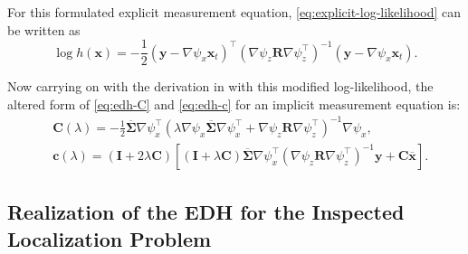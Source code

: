 For this formulated explicit measurement equation, \eqref{eq:explicit-log-likelihood} can be written as
\begin{equation}
  \log h(\mathbf{x}) =-\frac{1}{2}(\mathbf{y}-\nabla \psi_x \mathbf{x}_t)^{\top} (\nabla \psi_z\mathbf{R}\nabla \psi_z^{\top})^{-1}(\mathbf{y}-\nabla \psi_x \mathbf{x}_t).
\end{equation}

Now carrying on with the derivation in \cite{Khan2018} with this modified log-likelihood,
the altered form of \eqref{eq:edh-C} and \eqref{eq:edh-c} for an implicit measurement
equation is:
\begin{align}
   & \mathbf{C}(\lambda) = -\frac{1}{2}\mathbf{\mathbf{\overline\Sigma}}\nabla \psi_x^\top\left(\lambda \nabla \psi_x\mathbf{\overline\Sigma}\nabla \psi_x^\top + \nabla \psi_z\mathbf{R}\nabla \psi_z^{\top}\right)^{-1}\nabla \psi_x,  \label{eq:edh-C-impl}                             \\
   & \mathbf{c}(\lambda) = \left(\mathbf{I}+2\lambda\mathbf{C}\right)\left[\left(\mathbf{I}+\lambda\mathbf{C}\right)\mathbf{\overline\Sigma}\nabla \psi_x^\top(\nabla \psi_z\mathbf{R}\nabla \psi_z^{\top})^{-1}\mathbf{y} + \mathbf{C}\overline{\mathbf{x}}\right]. \label{eq:edh-c-impl}
\end{align}
\subsection{Realization of the EDH for the Inspected Localization Problem}


